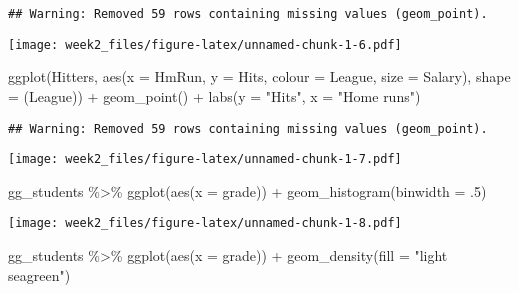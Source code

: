 \documentclass[
]{article}
\newenvironment{Shaded}{\begin{snugshade}}{\end{snugshade}}
\newcommand{\AttributeTok}[1]{\textcolor[rgb]{0.77,0.63,0.00}{#1}}
\newcommand{\DecValTok}[1]{\textcolor[rgb]{0.00,0.00,0.81}{#1}}
\newcommand{\FunctionTok}[1]{\textcolor[rgb]{0.00,0.00,0.00}{#1}}
\newcommand{\NormalTok}[1]{#1}
\newcommand{\SpecialCharTok}[1]{\textcolor[rgb]{0.00,0.00,0.00}{#1}}
\newcommand{\StringTok}[1]{\textcolor[rgb]{0.31,0.60,0.02}{#1}}
\begin{document}
\begin{verbatim}
## Warning: Removed 59 rows containing missing values (geom_point).
\end{verbatim}

\texttt{[image: week2\_files/figure-latex/unnamed-chunk-1-6.pdf]}

\begin{Shaded}
\begin{Highlighting}[]
  \FunctionTok{ggplot}\NormalTok{(Hitters, }\FunctionTok{aes}\NormalTok{(}\AttributeTok{x =}\NormalTok{ HmRun, }\AttributeTok{y =}\NormalTok{ Hits, }\AttributeTok{colour =}\NormalTok{ League, }\AttributeTok{size =}\NormalTok{ Salary), }\AttributeTok{shape =}\NormalTok{ (League)) }\SpecialCharTok{+} \FunctionTok{geom\_point}\NormalTok{() }\SpecialCharTok{+} \FunctionTok{labs}\NormalTok{(}\AttributeTok{y =} \StringTok{"Hits"}\NormalTok{, }\AttributeTok{x =} \StringTok{"Home runs"}\NormalTok{)}
\end{Highlighting}
\end{Shaded}

\begin{verbatim}
## Warning: Removed 59 rows containing missing values (geom_point).
\end{verbatim}

\texttt{[image: week2\_files/figure-latex/unnamed-chunk-1-7.pdf]}

\begin{Shaded}
\begin{Highlighting}[]
\NormalTok{    gg\_students }\SpecialCharTok{\%\textgreater{}\%}
  \FunctionTok{ggplot}\NormalTok{(}\FunctionTok{aes}\NormalTok{(}\AttributeTok{x =}\NormalTok{ grade)) }\SpecialCharTok{+} \FunctionTok{geom\_histogram}\NormalTok{(}\AttributeTok{binwidth =}\NormalTok{ .}\DecValTok{5}\NormalTok{)}
\end{Highlighting}
\end{Shaded}

\texttt{[image: week2\_files/figure-latex/unnamed-chunk-1-8.pdf]}

\begin{Shaded}
\begin{Highlighting}[]
\NormalTok{  gg\_students }\SpecialCharTok{\%\textgreater{}\%} 
  \FunctionTok{ggplot}\NormalTok{(}\FunctionTok{aes}\NormalTok{(}\AttributeTok{x =}\NormalTok{ grade)) }\SpecialCharTok{+} \FunctionTok{geom\_density}\NormalTok{(}\AttributeTok{fill =} \StringTok{"light seagreen"}\NormalTok{)}
\end{Highlighting}
\end{Shaded}
\end{document}
